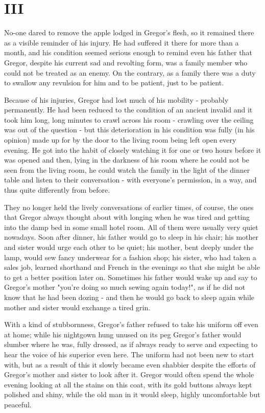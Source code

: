 \chapter{III}

No-one dared to remove the apple lodged in Gregor's flesh, so it remained there as a visible reminder of his injury. He had suffered it there for more than a month, and his condition seemed serious enough to remind even his father that Gregor, despite his current sad and revolting form, was a family member who could not be treated as an enemy. On the contrary, as a family there was a duty to swallow any revulsion for him and to be patient, just to be patient.

Because of his injuries, Gregor had lost much of his mobility - probably permanently. He had been reduced to the condition of an ancient invalid and it took him long, long minutes to crawl across his room - crawling over the ceiling was out of the question - but this deterioration in his condition was fully (in his opinion) made up for by the door to the living room being left open every evening. He got into the habit of closely watching it for one or two hours before it was opened and then, lying in the darkness of his room where he could not be seen from the living room, he could watch the family in the light of the dinner table and listen to their conversation - with everyone's permission, in a way, and thus quite differently from before.

They no longer held the lively conversations of earlier times, of course, the ones that Gregor always thought about with longing when he was tired and getting into the damp bed in some small hotel room. All of them were usually very quiet nowadays. Soon after dinner, his father would go to sleep in his chair; his mother and sister would urge each other to be quiet; his mother, bent deeply under the lamp, would sew fancy underwear for a fashion shop; his sister, who had taken a sales job, learned shorthand and French in the evenings so that she might be able to get a better position later on. Sometimes his father would wake up and say to Gregor's mother "you're doing so much sewing again today!", as if he did not know that he had been dozing - and then he would go back to sleep again while mother and sister would exchange a tired grin.

With a kind of stubbornness, Gregor's father refused to take his uniform off even at home; while his nightgown hung unused on its peg Gregor's father would slumber where he was, fully dressed, as if always ready to serve and expecting to hear the voice of his superior even here. The uniform had not been new to start with, but as a result of this it slowly became even shabbier despite the efforts of Gregor's mother and sister to look after it. Gregor would often spend the whole evening looking at all the stains on this coat, with its gold buttons always kept polished and shiny, while the old man in it would sleep, highly uncomfortable but peaceful.

